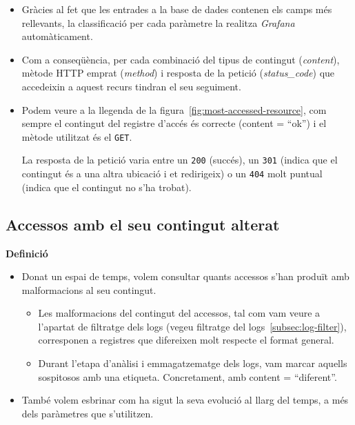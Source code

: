 \begin{itemize}
    \item Gràcies al fet que les entrades a la base de dades contenen els camps més rellevants, la classificació per cada paràmetre la realitza \textit{Grafana} automàticament.
    \item Com a conseqüència, per cada combinació del tipus de contingut (\textit{content}), mètode \gls{HTTP} emprat (\textit{method}) i resposta de la petició (\textit{status\_code}) que accedeixin a aquest recurs tindran el seu seguiment.
    \item Podem veure a la llegenda de la figura~\ref{fig:most-accessed-resource}, com sempre el contingut del registre d'accés és correcte (content = “ok”) i el mètode utilitzat és el \texttt{GET}.

    La resposta de la petició varia entre un \texttt{200} (succés), un \texttt{301} (indica que el contingut és a una altra ubicació i et redirigeix) o un \texttt{404} molt puntual (indica que el contingut no s'ha trobat).
\end{itemize}

\clearpage
\subsection{Accessos amb el seu contingut alterat}\label{subsec:content-altered-acces}

\textbf{Definició}

\begin{itemize}
    \item Donat un espai de temps, volem consultar quants accessos s'han produït amb malformacions al seu contingut.

    \begin{itemize}
        \item Les malformacions del contingut del accessos, tal com vam veure a l'apartat de filtratge dels logs (vegeu filtratge del logs~\ref{subsec:log-filter}), corresponen a registres que difereixen molt respecte el format general.
        \item Durant l'etapa d'anàlisi i emmagatzematge dels logs, vam marcar aquells sospitosos amb una etiqueta.
        Concretament, amb content = “diferent”.
    \end{itemize}

    \item També volem esbrinar com ha sigut la seva evolució al llarg del temps, a més dels paràmetres que s'utilitzen.
\end{itemize}

